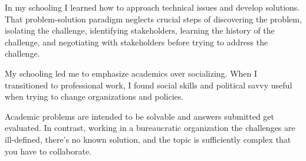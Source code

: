 






In my schooling I learned how to approach technical issues and develop solutions. That problem-solution paradigm neglects crucial steps of discovering the problem, isolating the challenge, identifying stakeholders, learning the history of the challenge, and negotiating with stakeholders before trying to address the challenge. 

My schooling led me to emphasize academics over socializing. When I transitioned to professional work, I found social skills and political savvy useful when trying to change organizations and policies. 

Academic problems are intended to be solvable and answers submitted get evaluated. In contrast, working in a bureaucratic organization the challenges are ill-defined, there's no known solution, and the topic is sufficiently complex that you have to collaborate.







